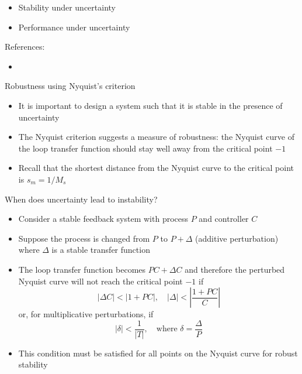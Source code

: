 \documentclass[10pt]{beamer-control}
\begin{document}

\begin{SUMMARY}
\begin{itemize}
\item Stability under uncertainty
\item Performance under uncertainty
\end{itemize}
\vfill References:
\begin{itemize}
\item \astrom[§13.2–§13.3]
\end{itemize}
\end{SUMMARY}




\begin{frame}{Robustness using Nyquist's criterion}
\begin{itemize}
\item It is important to design a system such that it is stable in the presence of uncertainty
\item The Nyquist criterion suggests a measure of robustness: the Nyquist curve of the loop transfer function should stay well away from the critical point $-1$
\item Recall that the shortest distance from the Nyquist curve to the critical point is $s_m=1/M_s$
\end{itemize}
\end{frame}


\begin{frame}{When does uncertainty lead to instability?}
	\begin{itemize}
		\item Consider a stable feedback system with process $P$ and controller $C$
		\item Suppose the process is changed from $P$ to $P+\Delta$ (additive perturbation) where $\Delta$ is a stable transfer function
		\item The loop transfer function becomes $PC+\Delta C$ and therefore the perturbed Nyquist curve will not reach the critical point $-1$ if
		\begin{equation}|\Delta C|<|1+PC|, \quad |\Delta| <\left|\frac{1+PC}{C}\right|\end{equation}
		or, for multiplicative perturbations, if
		\begin{equation}|\delta|<\frac{1}{|T|}, \quad \text{where } \delta=\frac{\Delta}{P}\end{equation}
		\item This condition must be satisfied for all points on the Nyquist curve for robust stability
	\end{itemize}
\end{frame}
\end{document}
